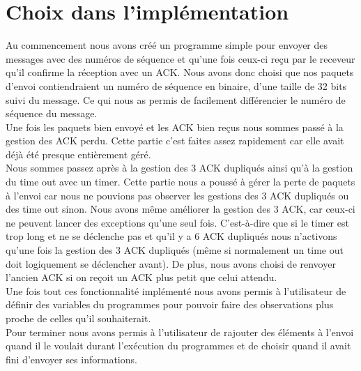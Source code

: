 \documentclass[a4paper,10pt]{article}
\begin{document}
\section{Choix dans l'implémentation}
Au commencement nous avons créé un programme simple pour envoyer des messages avec des numéros de séquence et qu'une fois ceux-ci reçu par le receveur qu'il confirme la réception avec un ACK. Nous avons donc choisi que nos paquets d'envoi contiendraient un numéro de séquence en binaire, d'une taille de 32 bits suivi du message. Ce qui nous as permis de facilement différencier le numéro de séquence du message.\\
Une fois les paquets bien envoyé et les ACK bien reçus nous sommes passé à la gestion des ACK perdu. Cette partie c'est faites assez rapidement car elle avait déjà été presque entièrement géré.\\
Nous sommes passez après à la gestion des 3 ACK dupliqués ainsi qu'à la gestion du time out avec un timer. Cette partie nous a poussé à gérer la perte de paquets à l'envoi car nous ne pouvions pas observer les gestions des 3 ACK dupliqués ou des time out sinon. Nous avons même améliorer la gestion des 3 ACK, car ceux-ci ne peuvent lancer des exceptions qu'une seul fois. C'est-à-dire que si le timer est trop long et ne se déclenche pas et qu'il y a 6 ACK dupliqués nous n'activons qu'une fois la gestion des 3 ACK dupliqués (même si normalement un time out doit logiquement se déclencher avant). De plus, nous avons choisi de renvoyer l'ancien ACK si on reçoit un ACK plus petit que celui attendu.\\
Une fois tout ces fonctionnalité implémenté nous avons permis à l'utilisateur de définir des variables du programmes pour pouvoir faire des observations plus proche de celles qu'il souhaiterait.\\
Pour terminer nous avons permis à l'utilisateur de rajouter des éléments à l'envoi quand il le voulait durant l'exécution du programmes et de choisir quand il avait fini d'envoyer ses informations.\\
\end{document}
